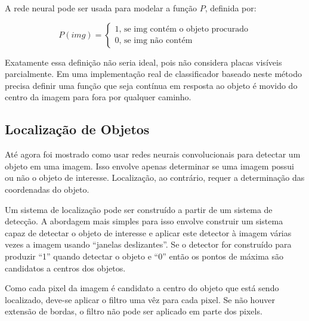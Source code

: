 A rede neural pode ser usada para modelar a função $P$, definida por:

\begin{equation}
	P(img) = \begin{cases}
		1 \text{, se img contém o objeto procurado} \\
		0 \text{, se img não contém}
	\end{cases}
\end{equation}

Exatamente essa definição não seria ideal, pois não considera placas visíveis
parcialmente. Em uma implementação real de classificador baseado neste método
precisa definir uma função que seja contínua em resposta ao objeto é movido do
centro da imagem para fora por qualquer caminho.

\subsection{Localização de Objetos} \label{sec:localiz_objetos}
Até agora foi mostrado como usar redes neurais convolucionais para detectar um
objeto em uma imagem. Isso envolve apenas determinar se uma imagem possui ou não
o objeto de interesse. Localização, ao contrário, requer a determinação das
coordenadas do objeto.

Um sistema de localização pode ser construído a partir de um sistema de
detecção. A abordagem mais simples para isso envolve construir um sistema capaz
de detectar o objeto de interesse e aplicar este
detector à imagem várias vezes a imagem usando ``janelas deslizantes''.
Se o detector for construído para produzir “1” quando detectar o objeto e
“0” então os pontos de máxima são candidatos a centros dos objetos.

Como cada pixel da imagem é candidato a centro do objeto que está sendo
localizado, deve-se aplicar o filtro uma vêz para cada pixel. Se não houver
extensão de bordas, o filtro não pode ser aplicado em parte dos pixels.
